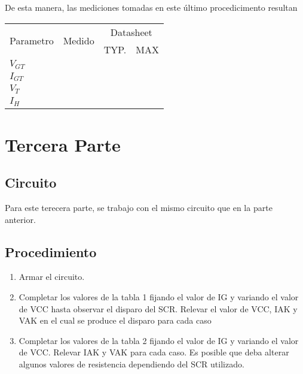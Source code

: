 De esta manera, las mediciones tomadas en este último procedicimento resultan
\begin{table}[H]
  \begin{center}
    \begin{tabular}{l|c|c|c}
      \multirow{2}{*}{Parametro} &\multirow{2}{*}{Medido}  &\multicolumn{2}{c}{Datasheet}  \\
      \cline{3-4}
                &  &TYP. &MAX  \\
      \hline
      $V_{GT}$    &  &  \\
      $I_{GT}$    &  &  \\
      $V_{T}$     &  &  \\
      $I_{H}$     &  &  \\
    \end{tabular}
  \end{center} 
\end{table}


\section{Tercera Parte}
\subsection{Circuito}
Para este terecera parte, se trabajo con el mismo circuito que en la parte anterior.
\subsection{Procedimiento}
\begin{enumerate}
  \item Armar el circuito.
  \item Completar los valores de la tabla 1 fijando el valor de IG y variando el valor
    de VCC hasta observar el disparo del SCR. Relevar el valor de VCC, IAK y VAK
    en el cual se produce el disparo para cada caso 
  \item Completar los valores de la tabla 2 fijando el valor de IG y variando el valor
    de VCC. Relevar IAK y VAK para cada caso. Es posible que deba alterar
    algunos valores de resistencia dependiendo del SCR utilizado.
\end{enumerate}
